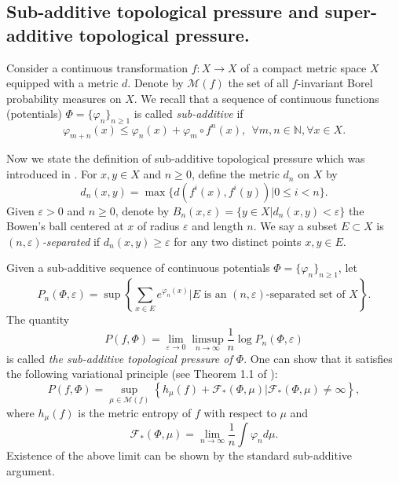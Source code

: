 \documentclass[11pt,a4paper]{amsart}
\theoremstyle{plain}
\theoremstyle{remark}
\def\max{\operatorname{max}}
\begin{document}
	
	\fi
	\subsection{Sub-additive topological pressure and super-additive topological pressure.}
	
	Consider a continuous transformation $f: X\to X$ of a compact metric space $X$ equipped with a metric $d$. Denote by $\mathcal{M}(f)$ the set of all $f$-invariant Borel probability measures on $X$. We recall that a sequence of continuous functions (potentials) $\Phi=\{\varphi_n\}_{n\geq1}$ is called {\it sub-additive} if
	$$\varphi_{m+n}(x)\leq \varphi_n(x)+ \varphi_m\circ f^n(x),\ \  \forall m,n\in\mathbb{N} , \forall x \in X.$$
	
	
	Now we state the definition of sub-additive topological pressure which was introduced in \cite{cfh}.  For $x,y\in X$ and $n\geq 0$, define the metric $d_n$ on $X$ by
	$$d_n(x, y) = \max\{d(f^i(x),f^i(y))|0\leq i<n\}.$$
	Given $\varepsilon>0$ and $n\geq 0$, denote by $B_n(x,\varepsilon)= \{y\in X |d_n(x,y)<\varepsilon\}$ the Bowen's ball centered at $x$ of radius $\varepsilon$ and length $n$. We say a subset $E\subset X$ is {\it $(n,\varepsilon)$-separated} if $d_n(x,y)\geq\varepsilon$ for any two distinct points $x,y\in E$.
	
	Given a sub-additive sequence of continuous potentials $\Phi=\{\varphi_n\}_{n\geq 1}$, let
	$$P_n(\Phi,\varepsilon)= \sup\left\{\sum_{x\in E}e^{\varphi_n(x)}|E \mbox{ is an }(n,\varepsilon) \mbox{-separated set of }X\right\}.$$
	The quantity
	$$P(f,\Phi) =\lim_{\varepsilon\to 0}\limsup_{n\to\infty}\frac{1}{n}\log P_n(\Phi,\varepsilon)$$
	is called {\it the sub-additive topological pressure of $\Phi$}. One can show that it satisfies the following variational principle (see Theorem 1.1 of \cite{cfh}):
	\begin{equation}\label{vp}P(f,\Phi) =\sup_{\mu\in \mathcal{M}(f)}\left\{h_\mu(f)+\mathcal{F}_*(\Phi,\mu)|\mathcal{F}_*(\Phi,\mu)\neq\infty\right\},\end{equation}
	where $h_\mu(f)$ is the metric entropy of $f$ with respect to $\mu$ and
	$$\mathcal{F}_*(\Phi,\mu)=\lim_{n\to\infty}\frac{1}{n}\int\varphi_nd\mu.$$
	Existence of the above limit can be shown by the standard sub-additive argument.
	
\end{document}
